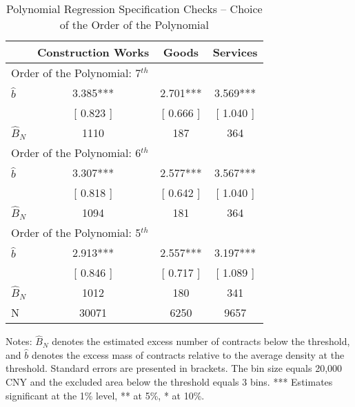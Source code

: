 \begin{table}[htbp]\centering
\caption{Polynomial Regression Specification Checks -- Choice of the Order of the Polynomial}
\begin{tabular}{lccc}
\hline\hline
& Construction Works & Goods & Services \\
\hline
\multicolumn{4}{l}{Order of the Polynomial: 7$^{th}$} \\
\(\hat b\) &  3.385*** &  2.701*** &  3.569*** \\
& [  0.823 ] & [  0.666 ] & [  1.040 ] \\
\(\hat B_N\) &   1110 &    187 &    364 \\
\hline
\multicolumn{4}{l}{Order of the Polynomial: 6$^{th}$} \\
\(\hat b\) &  3.307*** &  2.577*** &  3.567*** \\
& [  0.818 ] & [  0.642 ] & [  1.040 ] \\
\(\hat B_N\) &   1094 &    181 &    364 \\
\hline
\multicolumn{4}{l}{Order of the Polynomial: 5$^{th}$} \\
\(\hat b\) &  2.913*** &  2.557*** &  3.197*** \\
& [  0.846 ] & [  0.717 ] & [  1.089 ] \\
\(\hat B_N\) &   1012 &    180 &    341 \\
\hline
N     &  30071     &   6250     &   9657 \\
\hline\hline
\end{tabular}
\begin{flushleft}\footnotesize Notes: $\hat B_N$ denotes the estimated excess number of contracts below the threshold, and $\hat b$ denotes the excess mass of contracts relative to the average density at the threshold. Standard errors are presented in brackets. The bin size equals 20,000 CNY and the excluded area below the threshold equals 3 bins. *** Estimates significant at the 1\% level, ** at 5\%, * at 10\%.\end{flushleft}
\end{table}
